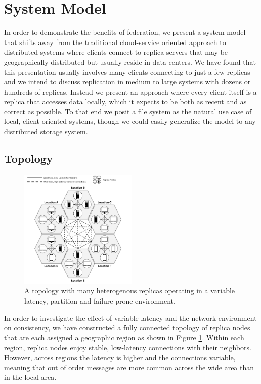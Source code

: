 \documentclass[10pt,conference,compsocconf,letterpaper]{IEEEtran}
\begin{document}
\section{System Model}

In order to demonstrate the benefits of federation, we present a system model that shifts away from the traditional cloud-service oriented approach to distributed systems where clients connect to replica servers that may be geographically distributed but usually reside in data centers. We have found that this presentation usually involves many clients connecting to just a few replicas and we intend to discuss replication in medium to large systems with dozens or hundreds of replicas. Instead we present an approach where every client itself is a replica that accesses data locally, which it expects to be both as recent and as correct as possible. To that end we posit a file system as the natural use case of local, client-oriented systems, though we could easily generalize the model to any distributed storage system.

\subsection{Topology}

\begin{figure}[h]
    \centering
    \includegraphics[width=0.5\textwidth]{figures/topology}
    \caption{A topology with many heterogenous replicas operating in a variable latency, partition and failure-prone environment.}
    \label{fig:topology}
\end{figure}

In order to investigate the effect of variable latency and the network environment on consistency, we have constructed a fully connected topology of replica nodes that are each assigned a geographic region as shown in Figure \ref{fig:topology}. Within each region, replica nodes enjoy stable, low-latency connections with their neighbors. However, across regions the latency is higher and the connections variable, meaning that out of order messages are more common across the wide area than in the local area.
\end{document}
